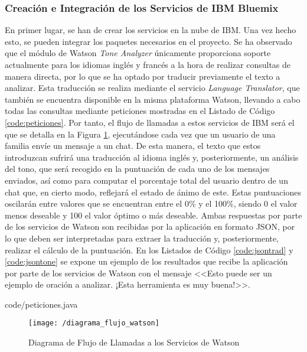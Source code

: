 \subsubsection{Creación e Integración de los Servicios de IBM Bluemix}
En primer lugar, se han de crear los servicios en la nube de IBM. Una vez hecho esto, se pueden integrar los paquetes necesarios en el proyecto. Se ha observado que el módulo de Watson \textit{Tone Analyzer} únicamente proporciona soporte actualmente para los idiomas inglés y francés a la hora de realizar consultas de manera directa, por lo que se ha optado por traducir previamente el texto a analizar. Esta traducción se realiza mediante el servicio \textit{Language Translator}, que también se encuentra disponible en la misma plataforma Watson, llevando a cabo todas las consultas mediante peticiones mostradas en el Listado de Código \ref{code:peticiones}. Por tanto, el flujo de llamadas a estos servicios de IBM será el que se detalla en la Figura \ref{fig:diaflujo}, ejecutándose cada vez que un usuario de una familia envíe un mensaje a un chat. De esta manera, el texto que estos introduzcan sufrirá una traducción al idioma inglés y, posteriormente, un análisis del tono, que será recogido en la puntuación de cada uno de los mensajes enviados, así como para computar el porcentaje total del usuario dentro de un chat que, en cierto modo, reflejará el estado de ánimo de este. Estas puntuaciones oscilarán entre valores que se encuentran entre el 0\% y el 100\%, siendo 0 el valor menos deseable y 100 el valor óptimo o más deseable. Ambas respuestas por parte de los servicios de Watson son recibidas por la aplicación en formato \acf{JSON}, por lo que deben ser interpretadas para extraer la traducción y, posteriormente, realizar el cálculo de la puntuación. En los Listados de Código \ref{code:jsontrad} y \ref{code:jsontone} se expone un ejemplo de los resultados que recibe la aplicación por parte de los servicios de Watson con el mensaje <<Esto puede ser un ejemplo de oración a analizar. ¡Esta herramienta es muy buena!>>.


						{code/peticiones.java}

\begin{figure}[!h]
	\begin{center}
		\texttt{[image: /diagrama\_flujo\_watson]}
		\caption{Diagrama de Flujo de Llamadas a los Servicios de Watson}
		\label{fig:diaflujo}
	\end{center}
\end{figure}

